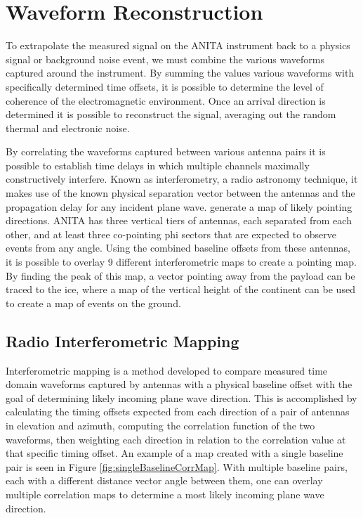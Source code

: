 \section{Waveform Reconstruction}
	To extrapolate the measured signal on the ANITA instrument back to a physics signal or background noise event, we must combine the various waveforms captured around the instrument.  By summing the values various waveforms with specifically determined time offsets, it is possible to determine the level of coherence of the electromagnetic environment.  Once an arrival direction is determined it is possible to reconstruct the signal, averaging out the random thermal and electronic noise.
	
	By correlating the waveforms captured between various antenna pairs it is possible to establish time delays in which multiple channels maximally constructively interfere.  Known as interferometry, a radio astronomy technique, it makes use of the known physical separation vector between the antennas and the propagation delay for any incident plane wave.  generate a map of likely pointing directions.  ANITA has three vertical tiers of antennas, each separated from each other, and at least three co-pointing phi sectors that are expected to observe events from any angle.  Using the combined baseline offsets from these antennas, it is possible to overlay 9 different interferometric maps to create a pointing map.  By finding the peak of this map, a vector pointing away from the payload can be traced to the ice, where a map of the vertical height of the continent can be used to create a map of events on the ground.
	
	\subsection{Radio Interferometric Mapping}
		Interferometric mapping is a method developed to compare measured time domain waveforms captured by antennas with a physical baseline offset with the goal of determining likely incoming plane wave direction.  This is accomplished by calculating the timing offsets expected from each direction of a pair of antennas in elevation and azimuth, computing the correlation function of the two waveforms, then weighting each direction in relation to the correlation value at that specific timing offset.  An example of a map created with a single baseline pair is seen in Figure \ref{fig:singleBaselineCorrMap}.  With multiple baseline pairs, each with a different distance vector angle between them, one can overlay multiple correlation maps to determine a most likely incoming plane wave direction.
		

